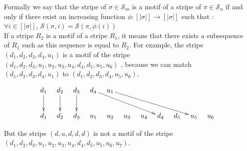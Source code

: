 \documentclass[12pt, a4paper]{article}
\newcommand{\Perm}[1]{\mathcal{S}_{#1}}
\newcommand{\ptext}{\pi}
\newcommand{\pmotif}{\sigma}
\newcounter{num}
\newcommand{\numl}[1]{\refstepcounter{num}\label{#1}}
\newcommand{\dstep}{d}
\newcommand{\ustep}{u}
\begin{document}
		

		
		Formally we say that the stripe of $\pmotif \in \Perm{m}$ is a motif
		of a stripe of $\ptext \in \Perm{n}$ if and only if there exist an increasing function $\phi : [|\pmotif|] \rightarrow [|\pmotif|]$
		such that : \\
		$\forall i \in [|\pmotif|]$, $\mathcal{S}(\pmotif,i) = \mathcal{S}(\ptext,\phi(i))$\\
		If a stripe $R_2$ is a motif of a stripe $R_1$,
		it means that there exists
		a subsequence of $R_1$ such as
		this sequence is equal to $R_2$.
		For example, the stripe $(\dstep_1,\dstep_2,\dstep_3,\dstep_4,\ustep_1)$ is a motif of  the stripe \\
		$(\dstep_1,\dstep_2,\dstep_3,\ustep_1,\ustep_2,\ustep_3,\ustep_4,\dstep_4,\dstep_5,\ustep_5,\ustep_6)$ ,
		because we can match \\
		$(\dstep_1,\dstep_2,\dstep_3,\dstep_4,\ustep_1)$ to $(\dstep_1,\dstep_2,\dstep_3,\dstep_4,\ustep_5,\ustep_6)$.
		\begin{figure}[h!]
			\begin{displaymath}
				\xymatrix@=0.3cm{
					\dstep_1 \ar[dd] & \dstep_2 \ar[dd] & \dstep_3 \ar[dd] & \dstep_4\ar[ddrrrr]  & \ustep_1 \ar[ddrrrrr]\\
					\\
					\dstep_1 & \dstep_2 & \dstep_3 & \ustep_1 & \ustep_2 & \ustep_3 & \ustep_4 & \dstep_4 & \dstep_5 & \ustep_5 & \ustep_6 \\
				}
			\end{displaymath}     
		\end{figure}		
		But the stripe $(\dstep,\ustep,\dstep,\dstep,\dstep)$ is not a motif of the stripe\\ $(\dstep_1,\dstep_2,\dstep_3,\ustep_1,\ustep_2,\ustep_3,\ustep_4,\dstep_4,\dstep_5,\ustep_5,\ustep_6,\ustep_7)$.\\
		
\end{document}
